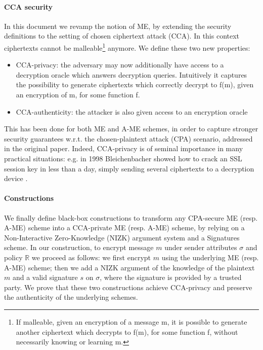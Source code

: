 \paragraph{CCA security}
In this document we revamp the notion of ME, by extending the security definitions to the setting of chosen ciphertext attack (CCA).
In this context ciphertexts cannot be malleable\footnote{If malleable, given an encryption of a message m, it is possible to generate another ciphertext which decrypts to f(m), for some function f, without necessarily knowing or learning m.} anymore. We define these two new properties:
\begin{itemize}
    \item CCA-privacy: the adversary may now additionally have access to a decryption oracle which answers decryption queries. Intuitively it captures the possibility to generate ciphertexts which correctly decrypt to f(m), given an encryption of m, for some function f.
    \item CCA-authenticity: the attacker is also given access to an encryption oracle
\end{itemize}
This has been done for both ME and A-ME schemes, in order to capture stronger security guarantees w.r.t. the chosen-plaintext attack (CPA) scenario, addressed in the original paper.
Indeed, CCA-privacy is of seminal importance in many practical situations: e.g. in 1998 Bleichenbacher showed how to crack an SSL session key in less than a day, simply sending several ciphertexts to a decryption device \cite{Bleichenbacher}.

\paragraph{Constructions}
We finally define black-box constructions to transform any CPA-secure ME (resp. A-ME) scheme into a CCA-private ME (resp. A-ME) scheme, by relying on a Non-Interactive Zero-Knowledge (NIZK) argument system and a Signatures scheme.
\newline
In our construction, to encrypt message $m$ under sender attributes $\sigma$ and policy $\mathbb{R}$ we proceed as follows: we first encrypt $m$ using the underlying ME (resp. A-ME) scheme; then we add a NIZK argument of the knowledge of the plaintext $m$ and a valid signature $s$ on $\sigma$, where the signature is provided by a trusted party.
\newline
We prove that these two constructions achieve CCA-privacy and preserve the authenticity of the underlying schemes.
